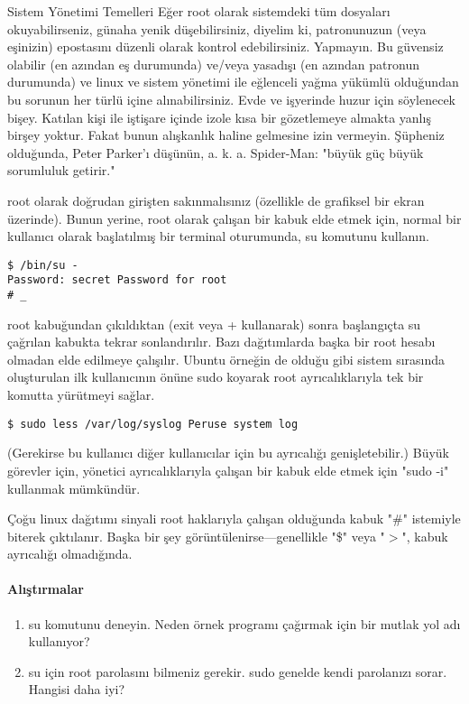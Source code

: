 \begin{section}{Sistem Yönetimi Temelleri}
Eğer root olarak sistemdeki tüm dosyaları okuyabilirseniz, günaha yenik düşebilirsiniz, diyelim ki, patronunuzun (veya eşinizin) epostasını düzenli olarak kontrol edebilirsiniz. Yapmayın. Bu güvensiz olabilir (en azından eş durumunda) ve/veya yasadışı (en azından patronun durumunda) ve linux ve sistem yönetimi ile eğlenceli yağma yükümlü olduğundan bu sorunun her türlü içine alınabilirsiniz. Evde ve işyerinde huzur için söylenecek bişey. Katılan kişi ile iştişare içinde izole kısa bir gözetlemeye almakta yanlış birşey yoktur. Fakat bunun alışkanlık haline gelmesine izin vermeyin. Şüpheniz olduğunda, Peter Parker'ı düşünün, a. k. a. Spider-Man: "büyük güç büyük sorumluluk getirir."

root olarak doğrudan girişten sakınmalısınız (özellikle de grafiksel bir ekran üzerinde). Bunun yerine, root olarak çalışan bir kabuk elde etmek için, normal bir kullanıcı olarak başlatılmış bir terminal oturumunda, su komutunu kullanın.
\begin{verbatim}
$ /bin/su -
Password: secret Password for root
# _
\end{verbatim}

root kabuğundan çıkıldıktan (exit veya \Ctrl+ kullanarak) sonra  başlangıçta su çağrılan kabukta tekrar sonlandırılır. Bazı dağıtımlarda başka bir root hesabı olmadan elde edilmeye çalışılır. Ubuntu örneğin de olduğu gibi sistem sırasında oluşturulan ilk kullanıcının önüne sudo koyarak root ayrıcalıklarıyla tek bir komutta yürütmeyi sağlar.
\begin{verbatim}
$ sudo less /var/log/syslog Peruse system log
\end{verbatim}

(Gerekirse bu kullanıcı diğer kullanıcılar için bu ayrıcalığı genişletebilir.) Büyük görevler için, yönetici ayrıcalıklarıyla çalışan bir kabuk elde etmek için "sudo -i" kullanmak mümkündür. 

Çoğu linux dağıtımı sinyali root haklarıyla çalışan olduğunda kabuk "\#" istemiyle biterek çıktılanır. Başka bir şey görüntülenirse—genellikle "\$" veya "$>$", kabuk ayrıcalığı olmadığında.

\paragraph{{\Huge{\PencilLeftDown}}Alıştırmalar}{
\begin{enumerate}
 \item su komutunu deneyin. Neden örnek programı çağırmak için bir mutlak yol adı kullanıyor?
 \item su için root parolasını bilmeniz gerekir. sudo genelde kendi parolanızı sorar. Hangisi daha iyi?
\end{enumerate}}
\end{section}
